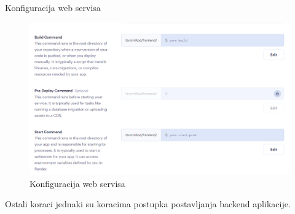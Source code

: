 \begin{packed_item}
   \item Konfiguracija web servisa \\
   
\begin{figure}[H]
			\includegraphics[width=\textwidth]{slike/Frontend1.PNG} %
			\caption{Konfiguracija web servisa}
			\label{fig:frontend1} %
		\end{figure}
		
   
   Ostali koraci jednaki su koracima postupka postavljanja backend aplikacije.
\end{packed_item}
			
			
			
			\eject 